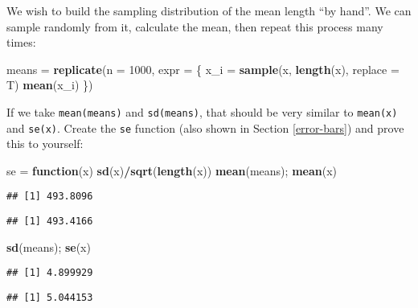 \documentclass[]{book}
\newenvironment{Shaded}{\begin{snugshade}}{\end{snugshade}}
\newcommand{\KeywordTok}[1]{\textcolor[rgb]{0.13,0.29,0.53}{\textbf{#1}}}
\newcommand{\DataTypeTok}[1]{\textcolor[rgb]{0.13,0.29,0.53}{#1}}
\newcommand{\DecValTok}[1]{\textcolor[rgb]{0.00,0.00,0.81}{#1}}
\newcommand{\StringTok}[1]{\textcolor[rgb]{0.31,0.60,0.02}{#1}}
\newcommand{\ControlFlowTok}[1]{\textcolor[rgb]{0.13,0.29,0.53}{\textbf{#1}}}
\newcommand{\OperatorTok}[1]{\textcolor[rgb]{0.81,0.36,0.00}{\textbf{#1}}}
\newcommand{\NormalTok}[1]{#1}
\theoremstyle{definition}
\theoremstyle{definition}
\theoremstyle{definition}
\theoremstyle{remark}
\begin{document}
We wish to build the sampling distribution of the mean length ``by
hand''. We can sample randomly from it, calculate the mean, then repeat
this process many times:

\begin{Shaded}
\begin{Highlighting}[]
\NormalTok{means =}\StringTok{ }\KeywordTok{replicate}\NormalTok{(}\DataTypeTok{n =} \DecValTok{1000}\NormalTok{, }\DataTypeTok{expr =}\NormalTok{ \{}
\NormalTok{  x_i =}\StringTok{ }\KeywordTok{sample}\NormalTok{(x, }\KeywordTok{length}\NormalTok{(x), }\DataTypeTok{replace =}\NormalTok{ T)}
  \KeywordTok{mean}\NormalTok{(x_i)}
\NormalTok{\})}
\end{Highlighting}
\end{Shaded}

If we take \texttt{mean(means)} and \texttt{sd(means)}, that should be
very similar to \texttt{mean(x)} and \texttt{se(x)}. Create the
\texttt{se} function (also shown in Section \ref{error-bars}) and prove
this to yourself:

\begin{Shaded}
\begin{Highlighting}[]
\NormalTok{se =}\StringTok{ }\ControlFlowTok{function}\NormalTok{(x) }\KeywordTok{sd}\NormalTok{(x)}\OperatorTok{/}\KeywordTok{sqrt}\NormalTok{(}\KeywordTok{length}\NormalTok{(x))}
\KeywordTok{mean}\NormalTok{(means); }\KeywordTok{mean}\NormalTok{(x)}
\end{Highlighting}
\end{Shaded}

\begin{verbatim}
## [1] 493.8096
\end{verbatim}

\begin{verbatim}
## [1] 493.4166
\end{verbatim}

\begin{Shaded}
\begin{Highlighting}[]
\KeywordTok{sd}\NormalTok{(means); }\KeywordTok{se}\NormalTok{(x)}
\end{Highlighting}
\end{Shaded}

\begin{verbatim}
## [1] 4.899929
\end{verbatim}

\begin{verbatim}
## [1] 5.044153
\end{verbatim}
\end{document}
